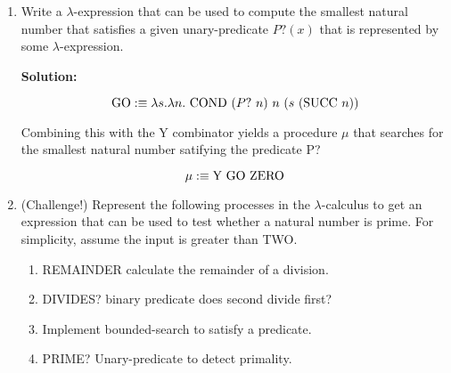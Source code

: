 \documentclass[11pt]{report}
\begin{document}
\begin{enumerate}
\begin{enumerate}
			
		\end{enumerate}

	\item Write a $\lambda$-expression that can be used to compute the smallest natural number that satisfies a given unary-predicate $P?(x)$ that is represented by some $\lambda$-expression. 
	
	{\bf Solution:}

	$$\GO :\equiv \lambda s. \lambda n. \ \COND \ (P? \ n) \ n \ (s \ (\SUCC \ n))$$

	Combining this with the Y combinator yields a procedure $\mu$ that searches for the smallest natural number satifying the predicate P?

	$$ \mu :\equiv \YCOMB \ \GO \ \ZERO $$

	\item (Challenge!) Represent the following processes in the $\lambda$-calculus to get an expression that can be used to test whether a natural number is prime. For simplicity, assume the input is greater than TWO.
	
		\begin{enumerate}
			\item REMAINDER calculate the remainder of a division.
			\item DIVIDES? binary predicate does second divide first?
			\item Implement bounded-search to satisfy a predicate.
			\item PRIME? Unary-predicate to detect primality.
		\end{enumerate}
	

	
	




\end{enumerate}
\end{document}
